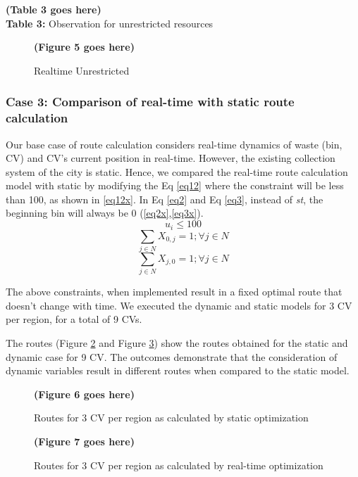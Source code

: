 \documentclass[12pt]{article}
\begin{document}
\begin{center}
    \textbf{(Table 3 goes here)}\\
    \textbf{Table 3:} Observation for unrestricted resources
\end{center}


\begin{figure}[H]
    \centering
    \textbf{(Figure 5 goes here)}
    \caption{Realtime Unrestricted}\label{fig2}
\end{figure}


\subsubsection*{Case 3: Comparison of real-time with static route calculation}

Our base case of route calculation considers real-time dynamics of waste (bin, CV) and CV's current position in real-time. However, the existing collection system of the city is static. Hence, we compared the real-time route calculation model with static by modifying the Eq \eqref{eq12} where the constraint will be less than 100, as shown in \eqref{eq12x}. In Eq \eqref{eq2} and Eq \eqref{eq3}, instead of \textit{st}, the beginning bin will always be 0
 (\ref{eq2x},\ref{eq3x}). 
\begin{equation}\label{eq12x}
    u_i\le 100
\end{equation}
\begin{equation}\label{eq2x}
    \sum_{j\in N}X_{0,j}=1 ; \forall j \in N
\end{equation}
\begin{equation}\label{eq3x}
    \sum_{j\in N}X_{j,0}=1 ; \forall j \in N
\end{equation}

The above constraints, when implemented result in a fixed optimal route that doesn't change with time. We executed the dynamic and static models for 3 CV per region, for a total of 9 CVs.



The routes (Figure \ref{fig4} and Figure \ref{fig5}) show the routes obtained for the static and dynamic case for 9 CV. The outcomes demonstrate that the consideration of dynamic variables result in different routes when compared to the static model.

\begin{figure}[H]
    \centering
    \textbf{(Figure 6 goes here)}
    \caption{Routes for 3 CV per region as calculated by static optimization}\label{fig4}
\end{figure}
\begin{figure}[H]
    \centering
    \textbf{(Figure 7 goes here)}
    \caption{Routes for 3 CV per region as calculated by real-time optimization}\label{fig5}
\end{figure}
\end{document}
